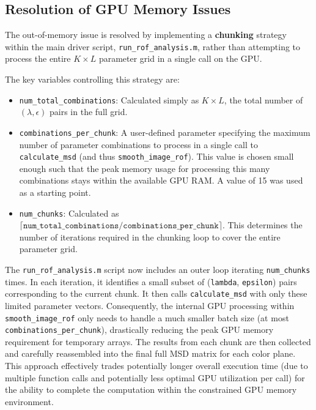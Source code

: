 \documentclass{article}
\begin{document}
	\subsection{Resolution of GPU Memory Issues}
	The out-of-memory issue is resolved by implementing a \textbf{chunking} strategy within the main driver script, \texttt{run\_rof\_analysis.m}, rather than attempting to process the entire $K \times L$ parameter grid in a single call on the GPU.
	
	The key variables controlling this strategy are:
	\begin{itemize}
		\item \texttt{num\_total\_combinations}: Calculated simply as $K \times L$, the total number of $(\lambda, \epsilon)$ pairs in the full grid.
		\item \texttt{combinations\_per\_chunk}: A user-defined parameter specifying the maximum number of parameter combinations to process in a single call to \texttt{calculate\_msd} (and thus \texttt{smooth\_image\_rof}). This value is chosen small enough such that the peak memory usage for processing this many combinations stays within the available GPU RAM. A value of 15 was used as a starting point.
		\item \texttt{num\_chunks}: Calculated as $\lceil \texttt{num\_total\_combinations} / \texttt{combinations\_per\_chunk} \rceil$. This determines the number of iterations required in the chunking loop to cover the entire parameter grid.
	\end{itemize}
	The \texttt{run\_rof\_analysis.m} script now includes an outer loop iterating \texttt{num\_chunks} times. In each iteration, it identifies a small subset of (\texttt{lambda}, \texttt{epsilon}) pairs corresponding to the current chunk. It then calls \texttt{calculate\_msd} with only these limited parameter vectors. Consequently, the internal GPU processing within \texttt{smooth\_image\_rof} only needs to handle a much smaller batch size (at most \texttt{combinations\_per\_chunk}), drastically reducing the peak GPU memory requirement for temporary arrays. The results from each chunk are then collected and carefully reassembled into the final full MSD matrix for each color plane. This approach effectively trades potentially longer overall execution time (due to multiple function calls and potentially less optimal GPU utilization per call) for the ability to complete the computation within the constrained GPU memory environment.
	
\end{document}
